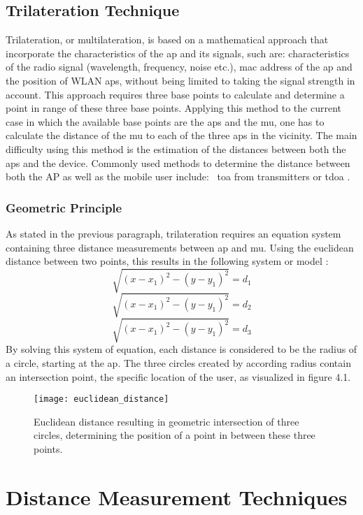\subsection{Trilateration Technique}
Trilateration, or multilateration, is based on a mathematical approach that incorporate the characteristics of the \acrshort{ap} and its signals, such are: characteristics of the radio signal (wavelength, frequency, noise etc.), \acrfull{mac} address of the \acrlong{ap} and the position of WLAN \acrshort{ap}s, without being limited to taking the signal strength in account. This approach requires three base points to calculate and determine a point in range of these three base points. Applying this method to the current case in which the available base points are the \acrshort{ap}s and the \acrshort{mu}, one has to calculate the distance of the \acrlong{mu} to each of the three \acrshort{ap}s in the vicinity. The main difficulty using this method is the estimation of the distances between both the \acrshort{ap}s and the device. Commonly used methods to determine the distance between both the AP as well as the mobile user include: \, \acrfull{toa} from transmitters or \acrfull{tdoa} \cite[p.~1]{Shchekotov} \cite[p.~60]{Mautz}.
\subsubsection{Geometric Principle}
As stated in the previous paragraph, trilateration requires an equation system containing three distance measurements between \acrshort{ap} and \acrlong{mu}. Using the euclidean distance between two points, this results in the following system or model \cite{CutTheKnot}:
\[ \sqrt{(x-x_1)^2 - (y-y_1)^2} = d_1 \]
\[ \sqrt{(x-x_1)^2 - (y-y_1)^2} = d_2 \]
\[ \sqrt{(x-x_1)^2 - (y-y_1)^2} = d_3 \]
By solving this system of equation, each distance is considered to be the radius of a circle, starting at the \acrshort{ap}. The three circles created by according radius contain an intersection point, the specific location of the user, as visualized in figure 4.1.
\begin{figure}[h!]
\centering
\texttt{[image: euclidean\_distance]}
\caption{Euclidean distance resulting in geometric intersection of three circles, determining the position of a point in between these three points.}
\label{fig:euclidean}
\end{figure}
\section{Distance Measurement Techniques}
